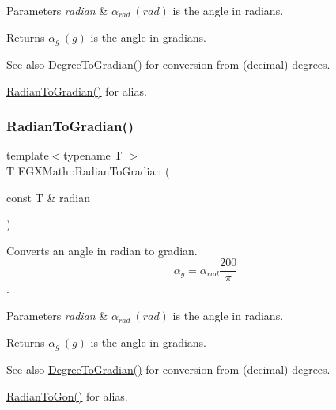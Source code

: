 \begin{DoxyParams}{Parameters}
{\em radian} & $\alpha_{rad}\ (rad)$ is the angle in radians. \\
\hline
\end{DoxyParams}
\begin{DoxyReturn}{Returns}
$\alpha_{g}\ (g)$ is the angle in gradians. 
\end{DoxyReturn}
\begin{DoxySeeAlso}{See also}
\mbox{\hyperlink{group___e_g_x_math-_angle_conversions-_degree_ga25bb5506b3f66fff7a1b85bf7bd795b3}{Degree\+To\+Gradian()}} for conversion from (decimal) degrees. 

\mbox{\hyperlink{group___e_g_x_math-_angle_conversions-_radian_ga3c1607eae50cbf0186c42485bb3878d5}{Radian\+To\+Gradian()}} for alias. 
\end{DoxySeeAlso}
\mbox{\label{group___e_g_x_math-_angle_conversions-_radian_ga3c1607eae50cbf0186c42485bb3878d5}} 
\subsubsection{\texorpdfstring{Radian\+To\+Gradian()}{RadianToGradian()}}
{\footnotesize\ttfamily template$<$typename T $>$ \\
T E\+G\+X\+Math\+::\+Radian\+To\+Gradian (\begin{DoxyParamCaption}\item[{const T \&}]{radian }\end{DoxyParamCaption})}



Converts an angle in radian to gradian. \[\alpha_{g}=\alpha_{rad}\frac{200}{\pi}\]. 


\begin{DoxyParams}{Parameters}
{\em radian} & $\alpha_{rad}\ (rad)$ is the angle in radians. \\
\hline
\end{DoxyParams}
\begin{DoxyReturn}{Returns}
$\alpha_{g}\ (g)$ is the angle in gradians. 
\end{DoxyReturn}
\begin{DoxySeeAlso}{See also}
\mbox{\hyperlink{group___e_g_x_math-_angle_conversions-_degree_ga25bb5506b3f66fff7a1b85bf7bd795b3}{Degree\+To\+Gradian()}} for conversion from (decimal) degrees. 

\mbox{\hyperlink{group___e_g_x_math-_angle_conversions-_radian_ga36912e5a810b64c271c4dafc17f4ca45}{Radian\+To\+Gon()}} for alias. 
\end{DoxySeeAlso}
\mbox{\label{group___e_g_x_math-_angle_conversions-_radian_ga55b5fba9307f34ab8db57391789a90cc}} 
